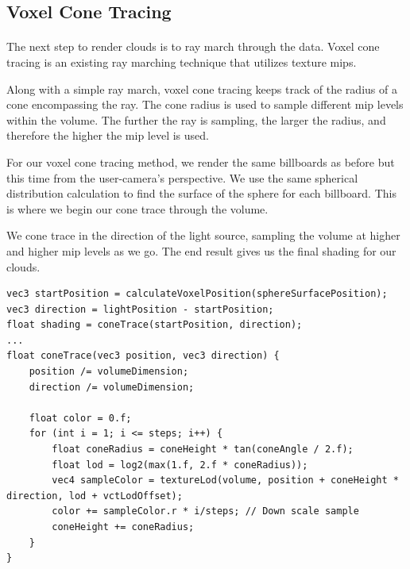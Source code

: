 \newpage
\subsection{Voxel Cone Tracing}\paragraph{}
The next step to render clouds is to ray march through the data. Voxel cone tracing is an existing ray marching technique that utilizes texture mips.

Along with a simple ray march, voxel cone tracing keeps track of the radius of a cone encompassing the ray. 
The cone radius is used to sample different mip levels within the volume. 
The further the ray is sampling, the larger the radius, and therefore the higher the mip level is used. 


For our voxel cone tracing method, we render the same billboards as before but this time from the user-camera's perspective. We use the same spherical distribution calculation to find the surface of the sphere for each billboard. This is where we begin our cone trace through the volume. 

We cone trace in the direction of the light source, sampling the volume at higher and higher mip levels as we go. The end result gives us the final shading for our clouds. 
\begin{lstlisting}[caption={conetrace\_frag.glsl, 63}]
vec3 startPosition = calculateVoxelPosition(sphereSurfacePosition);
vec3 direction = lightPosition - startPosition;
float shading = coneTrace(startPosition, direction);
...
float coneTrace(vec3 position, vec3 direction) {
    position /= volumeDimension;
    direction /= volumeDimension;

    float color = 0.f;
    for (int i = 1; i <= steps; i++) {
        float coneRadius = coneHeight * tan(coneAngle / 2.f);
        float lod = log2(max(1.f, 2.f * coneRadius));
        vec4 sampleColor = textureLod(volume, position + coneHeight * direction, lod + vctLodOffset);
        color += sampleColor.r * i/steps; // Down scale sample
        coneHeight += coneRadius;
    }
}
\end{lstlisting}\paragraph{}

